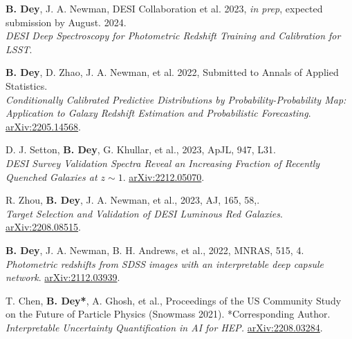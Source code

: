  \begin{etaremune}[leftmargin=40pt,labelsep=10pt]

    \item \textbf{B. Dey}, J. A. Newman, DESI Collaboration et al. 2023, \textit{in prep}, expected submission by August. 2024.\\
    \textrm{\textit{DESI Deep Spectroscopy for Photometric Redshift Training and Calibration for LSST}}. %
    
    
    \item  \textbf{B. Dey}, D. Zhao, J. A. Newman, et al. 2022, Submitted to Annals of Applied Statistics.\\
    \textrm{\textit{Conditionally Calibrated Predictive Distributions by Probability-Probability Map: Application to Galaxy Redshift Estimation and Probabilistic Forecasting}}.  \href{https://arxiv.org/abs/2205.14568}{arXiv:2205.14568}.
    
    \item D. J. Setton, \textbf{B. Dey}, G. Khullar, et al., 2023, ApJL, 947, L31.\\ \textrm{\textit{DESI Survey Validation Spectra Reveal an Increasing Fraction of Recently Quenched Galaxies at $z\sim 1$}}. \href{https://arxiv.org/abs/2212.05070}{arXiv:2212.05070}.
    
    \item R. Zhou, \textbf{B. Dey}, J. A. Newman, et al., 2023, AJ, 165, 58,.\\ \textrm{\textit{Target Selection and Validation of DESI Luminous Red Galaxies}}. \href{https://arxiv.org/abs/2208.08515}{arXiv:2208.08515}.
    
    \item  \textbf{B. Dey}, J. A. Newman, B. H. Andrews, et al., 2022, MNRAS, 515, 4.\\ \textrm{\textit{Photometric redshifts from SDSS images with an interpretable deep capsule network}}. \href{https://arxiv.org/abs/2112.03939}{arXiv:2112.03939}.
    
    \item T. Chen, \textbf{B. Dey*}, A. Ghosh, et al., Proceedings of the US Community Study on the Future of Particle Physics (Snowmass 2021). *Corresponding Author.\\ \textrm{\textit{Interpretable Uncertainty Quantification in AI for HEP.}} \href{https://arxiv.org/abs/2208.03284}{arXiv:2208.03284}.
    

\end{etaremune}
